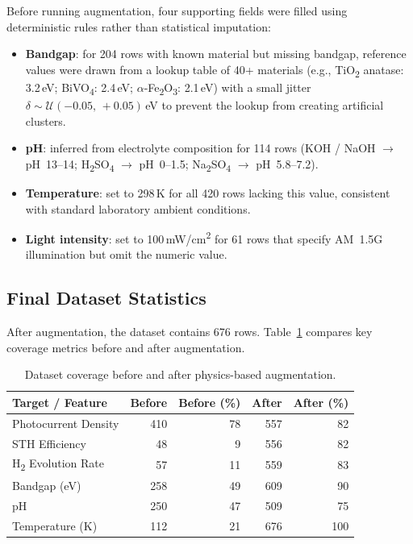 Before running augmentation, four supporting fields were filled using deterministic
rules rather than statistical imputation:

\begin{itemize}
  \item \textbf{Bandgap}: for 204 rows with known material but missing bandgap,
        reference values were drawn from a lookup table of 40+ materials
        (e.g., TiO\textsubscript{2} anatase: 3.2\,eV; BiVO\textsubscript{4}: 2.4\,eV;
        $\alpha$-Fe\textsubscript{2}O\textsubscript{3}: 2.1\,eV) with a small jitter
        $\delta \sim \mathcal{U}(-0.05,\,+0.05)$\,eV to prevent the lookup
        from creating artificial clusters.

  \item \textbf{pH}: inferred from electrolyte composition for 114 rows
        (KOH / NaOH $\to$ pH~13--14;
         H\textsubscript{2}SO\textsubscript{4} $\to$ pH~0--1.5;
         Na\textsubscript{2}SO\textsubscript{4} $\to$ pH~5.8--7.2).

  \item \textbf{Temperature}: set to 298\,K for all 420 rows lacking this value,
        consistent with standard laboratory ambient conditions.

  \item \textbf{Light intensity}: set to 100\,mW/cm\textsuperscript{2} for
        61 rows that specify AM~1.5G illumination but omit the numeric value.
\end{itemize}

\subsection{Final Dataset Statistics}

After augmentation, the dataset contains 676 rows.
Table~\ref{tab:augmented} compares key coverage metrics before and after
augmentation.

\begin{table}[htb]
\centering
\caption{Dataset coverage before and after physics-based augmentation.}
\label{tab:augmented}
\begin{tabular}{lrrrr}
\toprule
Target / Feature & Before & Before (\%) & After & After (\%) \\
\midrule
Photocurrent Density & 410 & 78 & 557 & 82 \\
STH Efficiency       & 48  &  9 & 556 & 82 \\
H\textsubscript{2} Evolution Rate & 57 & 11 & 559 & 83 \\
Bandgap (eV)         & 258 & 49 & 609 & 90 \\
pH                   & 250 & 47 & 509 & 75 \\
Temperature (K)      & 112 & 21 & 676 & 100 \\
\bottomrule
\end{tabular}
\end{table}

